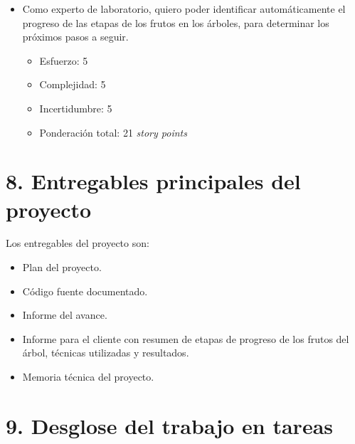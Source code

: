\documentclass[
11pt, %
]{charter}
\begin{document}
\begin{itemize}
\begin{itemize}
        \end{itemize}
    \item Como experto de laboratorio, quiero poder identificar automáticamente el progreso de las etapas
     de los frutos en los árboles, para determinar los próximos pasos a seguir.
        \begin{itemize}
            \item Esfuerzo: 5 
            \item Complejidad: 5 
            \item Incertidumbre: 5 
            \item Ponderación total: 21 \textit{story points} 
        \end{itemize}
\end{itemize}

\section{8. Entregables principales del proyecto}
\label{sec:entregables}

Los entregables del proyecto son:

\begin{itemize}
	\item Plan del proyecto.
	\item Código fuente documentado.
	\item Informe del avance.
	\item Informe para el cliente con resumen de etapas de progreso de los frutos del árbol, técnicas utilizadas y resultados.
	\item Memoria técnica del proyecto.
\end{itemize}


\section{9. Desglose del trabajo en tareas}
\label{sec:wbs}
\end{document}
